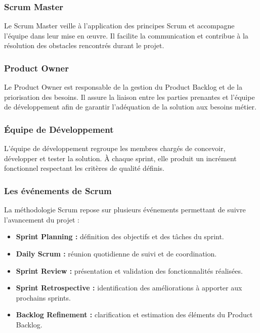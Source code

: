\subsubsection{Scrum Master}

Le Scrum Master veille à l'application des principes Scrum et accompagne l'équipe dans
leur mise en œuvre. Il facilite la communication et contribue à la résolution des obstacles
rencontrés durant le projet.

\subsubsection{Product Owner}

Le Product Owner est responsable de la gestion du Product Backlog et de la priorisation
des besoins. Il assure la liaison entre les parties prenantes et l'équipe de développement
afin de garantir l'adéquation de la solution aux besoins métier.

\subsubsection{Équipe de Développement}

L'équipe de développement regroupe les membres chargés de concevoir, développer et tester
la solution. À chaque sprint, elle produit un incrément fonctionnel respectant les critères
de qualité définis.

\subsubsection{Les événements de Scrum}

La méthodologie Scrum repose sur plusieurs événements permettant de suivre l'avancement
du projet :

\begin{itemize}
    \item \textbf{Sprint Planning :} définition des objectifs et des tâches du sprint.
    \item \textbf{Daily Scrum :} réunion quotidienne de suivi et de coordination.
    \item \textbf{Sprint Review :} présentation et validation des fonctionnalités réalisées.
    \item \textbf{Sprint Retrospective :} identification des améliorations à apporter aux
    prochains sprints.
    \item \textbf{Backlog Refinement :} clarification et estimation des éléments du
    Product Backlog.
\end{itemize}

